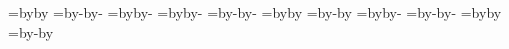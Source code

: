 {    \else
      \pgf@xa=\pgf@x\advance\pgf@xa by\comp\advance\pgf@ya by\minsep
      \edef\outdir{\csname west\endcsname}
    \fi
  \fi
\fi
\ifoutportonsouth
  \ifoutputsouth %
    \ifoutputwest %
      \pgf@xa=\pgf@x\advance\pgf@xa by-\comp\advance\pgf@ya by-\minsep
      \edef\outdir{\csname east\endcsname}
    \else
      \pgf@xa=\pgf@x\advance\pgf@xa by\comp\advance\pgf@ya by-\minsep
      \edef\outdir{\csname west\endcsname}
    \fi
  \else     
    \edef\outdir{\csname south\endcsname}
  \fi
\fi
\ifdim\pgf@y=\pgf@yd\inportonnorthtrue\else
  \pgfpointanchor{#3}{south}\ifdim\pgf@y=\pgf@yd\inportonsouthtrue\else
    \pgfpointanchor{#3}{west}\ifdim\pgf@x=\pgf@xd\inportonwesttrue\else
      \inportoneasttrue
    \fi
  \fi
\fi
\ifinportonwest
  \ifoutputwest
    \edef\indir{\csname west\endcsname}
  \else %
    \ifoutputsouth
      \pgf@yd=\pgf@y\advance\pgf@yd by\comp\advance\pgf@xd by-\minsep
      \edef\indir{\csname south\endcsname}
    \else
      \pgf@yd=\pgf@y\advance\pgf@yd by-\comp\advance\pgf@xd by-\minsep
      \edef\indir{\csname north\endcsname}
    \fi
  \fi
\fi
\ifinportoneast
  \ifoutputwest
    \ifoutputsouth
      \pgf@yd=\pgf@y\advance\pgf@yd by\comp\advance\pgf@xd by\minsep
      \edef\indir{\csname south\endcsname}
    \else %
      \pgf@yd=\pgf@y\advance\pgf@yd by-\comp\advance\pgf@xd by\minsep
      \edef\indir{\csname north\endcsname}
    \fi
  \else
    \edef\indir{\csname east\endcsname}
  \fi
\fi
\ifinportonsouth
  \ifoutputsouth
    \edef\indir{\csname south\endcsname}
  \else %
    \ifoutputwest
      \pgf@xd=\pgf@x\advance\pgf@xd by\comp\advance\pgf@yd by-\minsep
      \edef\indir{\csname west\endcsname}
    \else
      \pgf@xd=\pgf@x\advance\pgf@xd by-\comp\advance\pgf@yd by-\minsep
      \edef\indir{\csname east\endcsname}
    \fi
  \fi
\fi
\ifinportonnorth
  \ifoutputsouth 
    \ifoutputwest 
      \pgf@xd=\pgf@x\advance\pgf@xd by\comp\advance\pgf@yd by\minsep
      \edef\indir{\csname west\endcsname}
    \else %
      \pgf@xd=\pgf@x\advance\pgf@xd by-\comp\advance\pgf@yd by\minsep
      \edef\indir{\csname east\endcsname}
    \fi
  \else %
    \edef\indir{\csname north\endcsname}
  \fi
}
